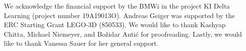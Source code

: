 \documentclass[acmtog,screen]{acmart}
\begin{document}
\clearpage
\begin{acks}
We acknowledge the financial support by the BMWi in the project KI Delta Learning (project number 19A19013O). 
Andreas Geiger was supported by the ERC Starting Grant LEGO-3D (850533). 
We would like to thank Kashyap Chitta, Michael Niemeyer, and Bo\v{z}idar Anti\'{c} for proofreading.
Lastly, we would like to thank Vanessa Sauer for her general support.
\end{acks}
\vspace{-20em}




\appendix

\end{document}
